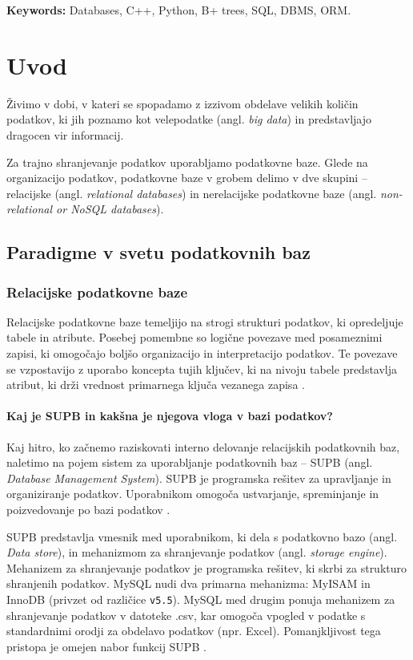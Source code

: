 \documentclass[a4paper,12pt,openright]{book}
\newcommand{\tkeywordsEn}{Databases, C++, Python, B+ trees, SQL, DBMS, ORM}
\newcommand{\clearemptydoublepage}{\newpage{\pagestyle{empty}\cleardoublepage}}
\begin{document}
\noindent\textbf{Keywords:} \tkeywordsEn.
\clearemptydoublepage

\mainmatter
\setcounter{page}{1}
\pagestyle{fancy}

\chapter{Uvod}
    Živimo v dobi, v kateri se spopadamo z izzivom obdelave velikih količin podatkov, ki jih poznamo kot velepodatke (angl. \textit{big data}) in predstavljajo dragocen vir informacij.
    
    Za trajno shranjevanje podatkov uporabljamo podatkovne baze. Glede na organizacijo podatkov, podatkovne baze v grobem delimo v dve skupini – relacijske (angl. \textit{relational databases}) in nerelacijske podatkovne baze (angl. \textit{non-relational or NoSQL databases}).
    
    \section{Paradigme v svetu podatkovnih baz}
        \subsection{Relacijske podatkovne baze}
        Relacijske podatkovne baze temeljijo na strogi strukturi podatkov, ki opredeljuje tabele in atribute. Posebej pomembne so logične povezave med posameznimi zapisi, ki omogočajo boljšo organizacijo in interpretacijo podatkov. Te povezave se vzpostavijo z uporabo koncepta tujih ključev, ki na nivoju tabele predstavlja atribut, ki drži vrednost primarnega ključa vezanega zapisa \cite{connolly2005database}.

        \subsubsection{Kaj je SUPB in kakšna je njegova vloga v bazi podatkov?}

        Kaj hitro, ko začnemo raziskovati interno delovanje relacijskih podatkovnih baz, naletimo na pojem sistem za uporabljanje podatkovnih baz – SUPB (angl. \textit{Database Management System}). SUPB je programska rešitev za upravljanje in organiziranje podatkov. Uporabnikom omogoča ustvarjanje, spreminjanje in poizvedovanje po bazi podatkov \cite{connolly2005database}.

        SUPB predstavlja vmesnik med uporabnikom, ki dela s podatkovno bazo (angl. \textit{Data store}), in mehanizmom za shranjevanje podatkov (angl. \textit{storage engine}). Mehanizem za shranjevanje podatkov je programska rešitev, ki skrbi za strukturo shranjenih podatkov. MySQL nudi dva primarna mehanizma: MyISAM in InnoDB (privzet od različice {\tt v5.5}). MySQL med drugim ponuja mehanizem za shranjevanje podatkov v datoteke .csv, kar omogoča vpogled v podatke s standardnimi orodji za obdelavo podatkov (npr. Excel). Pomanjkljivost tega pristopa je omejen nabor funkcij SUPB \cite{MYSQL_SE}.
\end{document}
